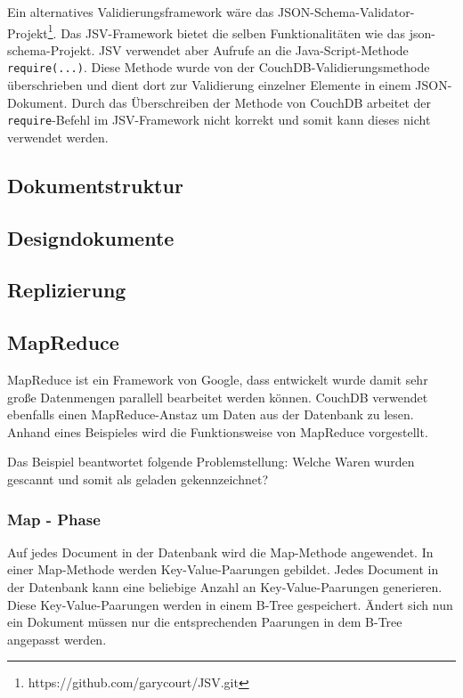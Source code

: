 Ein alternatives Validierungsframework wäre das JSON-Schema-Validator-Projekt\footnote{https://github.com/garycourt/JSV.git}. Das JSV-Framework bietet die selben Funktionalitäten wie das json-schema-Projekt. JSV verwendet aber Aufrufe an die Java-Script-Methode \texttt{require(...)}. Diese Methode wurde von der CouchDB-Validierungsmethode überschrieben und dient dort zur Validierung einzelner Elemente in einem JSON-Dokument. Durch das Überschreiben der Methode von CouchDB arbeitet der \texttt{require}-Befehl im JSV-Framework nicht korrekt und somit kann dieses nicht verwendet werden.

\subsection{Dokumentstruktur}

\subsection{Designdokumente}

\subsection{Replizierung}

\subsection{MapReduce}

MapReduce ist ein Framework von Google, dass entwickelt wurde damit sehr große Datenmengen parallell bearbeitet werden können. CouchDB verwendet ebenfalls einen MapReduce-Anstaz um Daten aus der Datenbank zu lesen. Anhand eines Beispieles wird die Funktionsweise von MapReduce vorgestellt.

Das Beispiel beantwortet folgende Problemstellung: Welche Waren wurden gescannt und somit als geladen gekennzeichnet?

\subsubsection{Map - Phase}

Auf jedes Document in der Datenbank wird die Map-Methode angewendet. In einer Map-Methode werden Key-Value-Paarungen gebildet. Jedes Document in der Datenbank kann eine beliebige Anzahl an Key-Value-Paarungen generieren. Diese Key-Value-Paarungen werden in einem B-Tree gespeichert. Ändert sich nun ein Dokument müssen nur die entsprechenden Paarungen in dem B-Tree angepasst werden. 

